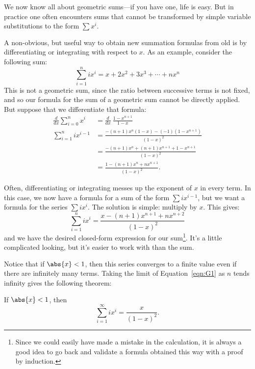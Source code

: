 We now know all about geometric sums---if you have one, life is easy.
But in practice one often encounters sums that cannot be transformed
by simple variable substitutions to the form $\sum x^i$.

A non-obvious, but useful way to obtain new summation formulas from
old is by differentiating or integrating with respect to $x$.  As an
example, consider the following sum:
\[
\sum_{i=1}^n i x^i = x + 2 x^2 + 3 x^3 + \cdots + n x^n
\]
This is not a geometric sum, since the ratio between successive terms
is not fixed, and so our formula for the sum of a geometric sum cannot
be directly applied.  But suppose that we differentiate that
formula:
\begin{align*}
\frac{d}{dx} \sum_{i=0}^{n} x^i
  & = \frac{d}{dx} \ \frac{1 - x^{n+1}}{1 - x} \\
\sum_{i=1}^{n} i x^{i-1}
 & = \frac{-(n+1)x^n (1-x) - (-1)(1-x^{n+1})}{(1 - x)^2} \\
 & = \frac{-(n+1)x^n + (n+1)x^{n+1} + 1 - x^{n+1}}{(1 - x)^2} \\
 & = \frac{1 - (n+1)x^n + n x^{n+1}}{(1 - x)^2}.
\end{align*}

Often, differentiating or integrating messes up the exponent of $x$ in
every term.  In this case, we now have a formula for a sum of the form
$\sum i x^{i-1}$, but we want a formula for the series $\sum i x^i$.
The solution is simple: multiply by $x$.  This gives:
\begin{equation}\label{eqn:G1}
    \sum_{i=1}^{n} i x^i = \frac{x - (n+1)x^{n+1} + n x^{n+2}}{(1 - x)^2}
\end{equation}
and we have the desired closed-form expression for our
sum\footnote{Since we could easily have made a mistake in the
  calculation, it is always a good idea to go back and validate a
  formula obtained this way with a proof by induction.}.  It's a
little complicated looking, but it's easier to work with than the sum.

Notice that if $\abs{x} < 1$, then this series converges to a finite
value even if there are infinitely many terms.  Taking the limit of
Equation~\ref{eqn:G1} as $n$ tends infinity gives the following
theorem:
\begin{theorem}\label{th:inf_ixi}
If $\abs{x} < 1$, then
\[
    \sum_{i=1}^\infty i x^i = \frac{x}{(1-x)^2}.
\]
\end{theorem}

